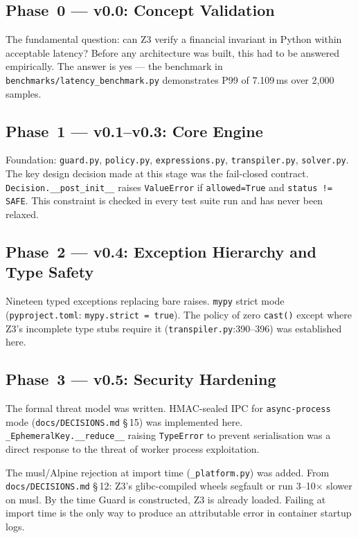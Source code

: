 \documentclass[12pt,a4paper,oneside]{report}
\newcommand{\fname}[1]{\texttt{#1}}          %
\newcommand{\code}[1]{\texttt{#1}}           %
\newcommand{\cfrsec}[1]{\S\,#1}             %
\begin{document}
\subsection{Phase~0 --- v0.0: Concept Validation}

The fundamental question: can Z3 verify a financial invariant in Python within
acceptable latency? Before any architecture was built, this had to be answered
empirically. The answer is yes --- the benchmark in
\fname{benchmarks/latency\_benchmark.py} demonstrates P99 of 7.109\,ms over
2,000 samples.

\subsection{Phase~1 --- v0.1--v0.3: Core Engine}

Foundation: \fname{guard.py}, \fname{policy.py}, \fname{expressions.py},
\fname{transpiler.py}, \fname{solver.py}. The key design decision made at
this stage was the fail-closed contract. \code{Decision.\_\_post\_init\_\_}
raises \code{ValueError} if \code{allowed=True} and \code{status != SAFE}.
This constraint is checked in every test suite run and has never been relaxed.

\subsection{Phase~2 --- v0.4: Exception Hierarchy and Type Safety}

Nineteen typed exceptions replacing bare raises. \code{mypy} strict mode
(\fname{pyproject.toml}: \code{mypy.strict = true}). The policy of zero
\code{cast()} except where Z3's incomplete type stubs require it
(\fname{transpiler.py}:390--396) was established here.

\subsection{Phase~3 --- v0.5: Security Hardening}

The formal threat model was written. HMAC-sealed IPC for \code{async-process}
mode (\fname{docs/DECISIONS.md} \cfrsec{15}) was implemented here.
\code{\_EphemeralKey.\_\_reduce\_\_} raising \code{TypeError} to prevent
serialisation was a direct response to the threat of worker process
exploitation.

The musl/Alpine rejection at import time (\fname{\_platform.py}) was added.
From \fname{docs/DECISIONS.md} \cfrsec{12}: Z3's glibc-compiled wheels
segfault or run 3--10$\times$ slower on musl. By the time Guard is
constructed, Z3 is already loaded. Failing at import time is the only way to
produce an attributable error in container startup logs.
\end{document}
